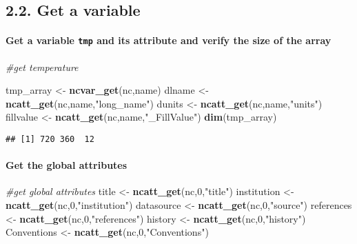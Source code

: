 \documentclass[]{article}
\newenvironment{Shaded}{\begin{snugshade}}{\end{snugshade}}
\newcommand{\KeywordTok}[1]{\textcolor[rgb]{0.13,0.29,0.53}{\textbf{#1}}}
\newcommand{\DecValTok}[1]{\textcolor[rgb]{0.00,0.00,0.81}{#1}}
\newcommand{\StringTok}[1]{\textcolor[rgb]{0.31,0.60,0.02}{#1}}
\newcommand{\CommentTok}[1]{\textcolor[rgb]{0.56,0.35,0.01}{\textit{#1}}}
\newcommand{\NormalTok}[1]{#1}
\let\oldparagraph\paragraph
\renewcommand{\paragraph}[1]{\oldparagraph{#1}\mbox{}}
\begin{document}
\subsection{2.2. Get a variable}\label{get-a-variable}

\paragraph{\texorpdfstring{Get a variable \texttt{tmp} and its attribute
and verify the size of the
array}{Get a variable tmp and its attribute and verify the size of the array}}\label{get-a-variable-tmp-and-its-attribute-and-verify-the-size-of-the-array}

\begin{Shaded}
\begin{Highlighting}[]
\CommentTok{#get temperature}

\NormalTok{tmp_array <-}\StringTok{ }\KeywordTok{ncvar_get}\NormalTok{(nc,name)}
\NormalTok{dlname <-}\StringTok{ }\KeywordTok{ncatt_get}\NormalTok{(nc,name,}\StringTok{"long_name"}\NormalTok{)}
\NormalTok{dunits <-}\StringTok{ }\KeywordTok{ncatt_get}\NormalTok{(nc,name,}\StringTok{"units"}\NormalTok{)}
\NormalTok{fillvalue <-}\StringTok{ }\KeywordTok{ncatt_get}\NormalTok{(nc,name,}\StringTok{"_FillValue"}\NormalTok{)}
\KeywordTok{dim}\NormalTok{(tmp_array)}
\end{Highlighting}
\end{Shaded}

\begin{verbatim}
## [1] 720 360  12
\end{verbatim}

\paragraph{Get the global attributes}\label{get-the-global-attributes}

\begin{Shaded}
\begin{Highlighting}[]
\CommentTok{#get global attributes}
\NormalTok{title <-}\StringTok{ }\KeywordTok{ncatt_get}\NormalTok{(nc,}\DecValTok{0}\NormalTok{,}\StringTok{"title"}\NormalTok{)}
\NormalTok{institution <-}\StringTok{ }\KeywordTok{ncatt_get}\NormalTok{(nc,}\DecValTok{0}\NormalTok{,}\StringTok{"institution"}\NormalTok{)}
\NormalTok{datasource <-}\StringTok{ }\KeywordTok{ncatt_get}\NormalTok{(nc,}\DecValTok{0}\NormalTok{,}\StringTok{"source"}\NormalTok{)}
\NormalTok{references <-}\StringTok{ }\KeywordTok{ncatt_get}\NormalTok{(nc,}\DecValTok{0}\NormalTok{,}\StringTok{"references"}\NormalTok{)}
\NormalTok{history <-}\StringTok{ }\KeywordTok{ncatt_get}\NormalTok{(nc,}\DecValTok{0}\NormalTok{,}\StringTok{"history"}\NormalTok{)}
\NormalTok{Conventions <-}\StringTok{ }\KeywordTok{ncatt_get}\NormalTok{(nc,}\DecValTok{0}\NormalTok{,}\StringTok{"Conventions"}\NormalTok{)}
\end{Highlighting}
\end{Shaded}
\end{document}
